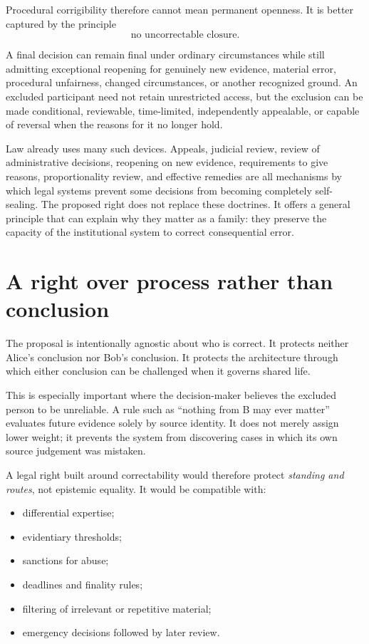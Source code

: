 \documentclass[11pt,a4paper]{article}
\begin{document}
Procedural corrigibility therefore cannot mean permanent openness. It is better captured by the principle
\[
\boxed{\text{no uncorrectable closure}.}
\]

A final decision can remain final under ordinary circumstances while still admitting exceptional reopening for genuinely new evidence, material error, procedural unfairness, changed circumstances, or another recognized ground. An excluded participant need not retain unrestricted access, but the exclusion can be made conditional, reviewable, time-limited, independently appealable, or capable of reversal when the reasons for it no longer hold.

Law already uses many such devices. Appeals, judicial review, review of administrative decisions, reopening on new evidence, requirements to give reasons, proportionality review, and effective remedies are all mechanisms by which legal systems prevent some decisions from becoming completely self-sealing. The proposed right does not replace these doctrines. It offers a general principle that can explain why they matter as a family: they preserve the capacity of the institutional system to correct consequential error.

\section{A right over process rather than conclusion}

The proposal is intentionally agnostic about who is correct. It protects neither Alice's conclusion nor Bob's conclusion. It protects the architecture through which either conclusion can be challenged when it governs shared life.

This is especially important where the decision-maker believes the excluded person to be unreliable. A rule such as ``nothing from B may ever matter'' evaluates future evidence solely by source identity. It does not merely assign lower weight; it prevents the system from discovering cases in which its own source judgement was mistaken.

A legal right built around correctability would therefore protect \emph{standing and routes}, not epistemic equality. It would be compatible with:
\begin{itemize}
  \item differential expertise;
  \item evidentiary thresholds;
  \item sanctions for abuse;
  \item deadlines and finality rules;
  \item filtering of irrelevant or repetitive material;
  \item emergency decisions followed by later review.
\end{itemize}
\end{document}
